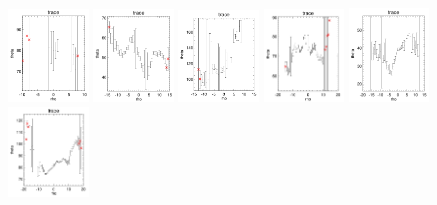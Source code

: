 \documentclass[fleqn,usenatbib]{mnras}
\begin{document}
\begin{figure}
    \centering
    \includegraphics[width=0.19\textwidth]{Images/trace-plots/trace-plots-cpsbs/7964-1902.png}
    \includegraphics[width=0.19\textwidth]{Images/trace-plots/trace-plots-cpsbs/8080-3702.png}
    \includegraphics[width=0.19\textwidth]{Images/trace-plots/trace-plots-cpsbs/8081-3702.png}
    \includegraphics[width=0.19\textwidth]{Images/trace-plots/trace-plots-cpsbs/8082-3704.png}
    \includegraphics[width=0.19\textwidth]{Images/trace-plots/trace-plots-cpsbs/8143-3703.png}
    \includegraphics[width=0.19\textwidth]{Images/trace-plots/trace-plots-cpsbs/8313-6101.png}

\end{figure}
\end{document}
